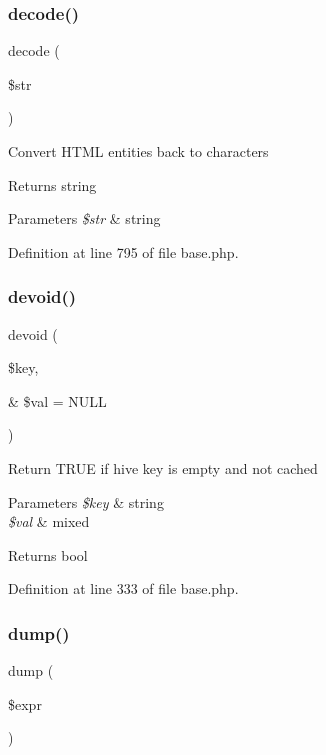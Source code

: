 \subsubsection{\texorpdfstring{decode()}{decode()}}
{\footnotesize\ttfamily decode (\begin{DoxyParamCaption}\item[{}]{\$str }\end{DoxyParamCaption})}

Convert H\+T\+ML entities back to characters \begin{DoxyReturn}{Returns}
string 
\end{DoxyReturn}

\begin{DoxyParams}{Parameters}
{\em \$str} & string \\
\hline
\end{DoxyParams}


Definition at line 795 of file base.\+php.

\hypertarget{class_base_a7de02315df24d7ef20a0bd441060d6d2}{}\label{class_base_a7de02315df24d7ef20a0bd441060d6d2} 
\subsubsection{\texorpdfstring{devoid()}{devoid()}}
{\footnotesize\ttfamily devoid (\begin{DoxyParamCaption}\item[{}]{\$key,  }\item[{\&}]{\$val = {\ttfamily NULL} }\end{DoxyParamCaption})}

Return T\+R\+UE if hive key is empty and not cached 
\begin{DoxyParams}{Parameters}
{\em \$key} & string \\
\hline
{\em \$val} & mixed \\
\hline
\end{DoxyParams}
\begin{DoxyReturn}{Returns}
bool 
\end{DoxyReturn}


Definition at line 333 of file base.\+php.

\hypertarget{class_base_a238c9a8c7839b0773ee92327c86d3438}{}\label{class_base_a238c9a8c7839b0773ee92327c86d3438} 
\subsubsection{\texorpdfstring{dump()}{dump()}}
{\footnotesize\ttfamily dump (\begin{DoxyParamCaption}\item[{}]{\$expr }\end{DoxyParamCaption})}

